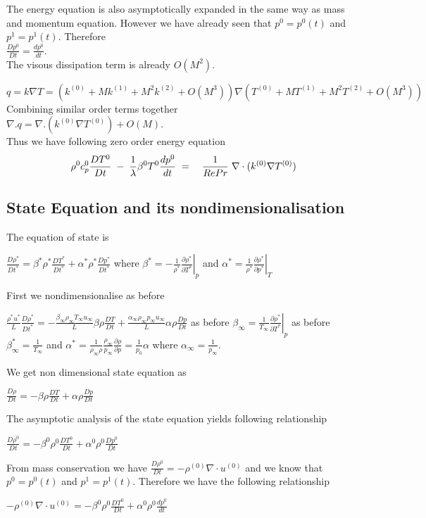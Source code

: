 \documentclass[11pt,a4paper]{article}
\begin{document}
 The energy equation is also asymptotically expanded in the same way as mass and momentum equation. However we have already seen that $p^0=p^0(t)$ and $p^1=p^1(t)$. Therefore \\
 $\frac{Dp^0}{Dt}= \frac{dp^0}{dt}$. \\
 The visous dissipation term is already $O(M^2)$.
 
$q=k \nabla T = (k^{(0)}+Mk^{(1)}+M^2k^{(2)}+O(M^3)) \nabla (T^{(0)}+MT^{(1)}+M^2T^{(2)}+O(M^3))$ \\
Combining similar order terms together \\
$\nabla . q =  \nabla . (k^{(0)} \nabla T^{(0)}) + O(M)$. \\
Thus we have following zero order energy equation
\begin{eqnarray}
 \rho^0 c_p^0 \frac{D T^0}{D t}\hspace{1mm}-\hspace{1mm}\frac{1}{\lambda} \beta^0 T^0 \frac{d p^0}{d t} \hspace{1mm} &=& \hspace{1mm} \frac{1}{RePr} \hspace{1mm} \nabla \cdot (k^{(0)} \nabla T^{(0)})
\end{eqnarray}
\subsection{State Equation and its nondimensionalisation}

The equation of state is 

$\frac{D \rho^*}{D t^*}= \beta^* \rho^* \frac{D T^*}{D t^*} + \alpha^* \rho^* \frac{D p^*}{D t^*}$ where $\beta^* = -\frac{1}{\rho^*} \left.\frac{\partial \rho^*}{\partial T^*}\right|_p$ and $\alpha^*=\frac{1}{\rho^*}  \left. \frac{\partial \rho^*}{\partial p^*} \right|_T $

First we nondimensionalise as before 

$\frac{\rho^* u^*}{L}\frac{D \rho^*}{D t^*}=-\frac{\beta_\infty \rho_\infty T_\infty u_\infty}{L} \beta \rho \frac{D T}{D t} + \frac{\alpha_\infty \rho_\infty p_\infty u_\infty}{L} \alpha \rho \frac{D p}{D t}$ as before $\beta_\infty = \frac{1}{T_\infty} \left.\frac{\partial \rho^*}{\partial T^*}\right|_p$ as before $\beta_\infty^*=\frac{1}{T_\infty}$ and $\alpha^*= \frac{1}{\rho_\infty \rho} \frac{\rho_\infty}{p_\infty} \frac{\partial \rho}{\partial p} = \frac{1}{p_0} \alpha$ where $\alpha_\infty = \frac{1}{p_\infty}$. 

We get non dimensional state equation as

$\frac{D \rho}{D t}= -\beta \rho \frac{D T}{D t} + \alpha \rho \frac{D p}{D t}$ 

The asymptotic analysis of the state equation yields following relationship 

$\frac{D \rho^0}{D t}= -\beta^0 \rho^0 \frac{D T^0}{D t} + \alpha^0 \rho^0 \frac{D p^0}{D t}$ 

From mass conservation we have 
$\frac{D \rho^0}{D t} = - \rho^{(0)} \nabla \cdot u^{(0)}$ and we know that $p^0=p^0(t)$ and $p^1=p^1(t)$. Therefore we have the following relationship

$ - \rho^{(0)} \nabla \cdot u^{(0)} = -\beta^0 \rho^0 \frac{D T^0}{D t} + \alpha^0 \rho^0 \frac{d p^0}{d t}$
\end{document}
